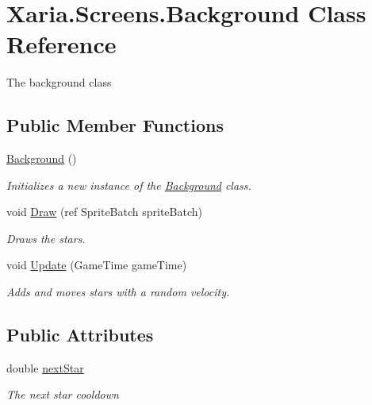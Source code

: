 \hypertarget{classXaria_1_1Screens_1_1Background}{}\section{Xaria.\+Screens.\+Background Class Reference}
\label{classXaria_1_1Screens_1_1Background}


The background class  


\subsection*{Public Member Functions}
\begin{DoxyCompactItemize}
\item 
\hyperlink{classXaria_1_1Screens_1_1Background_a458fa6c55e61b678da2812d182d021a8}{Background} ()
\begin{DoxyCompactList}\small\item\em Initializes a new instance of the \hyperlink{classXaria_1_1Screens_1_1Background}{Background} class. \end{DoxyCompactList}\item 
void \hyperlink{classXaria_1_1Screens_1_1Background_ad324cde0b40966085c72a167f9ef940e}{Draw} (ref Sprite\+Batch sprite\+Batch)
\begin{DoxyCompactList}\small\item\em Draws the stars. \end{DoxyCompactList}\item 
void \hyperlink{classXaria_1_1Screens_1_1Background_a5008a9ab39ee86f901e965f9121b08e2}{Update} (Game\+Time game\+Time)
\begin{DoxyCompactList}\small\item\em Adds and moves stars with a random velocity. \end{DoxyCompactList}\end{DoxyCompactItemize}
\subsection*{Public Attributes}
\begin{DoxyCompactItemize}
\item 
double \hyperlink{classXaria_1_1Screens_1_1Background_a6ebc6e316dfe7749361c94d7ce128bc0}{next\+Star}
\begin{DoxyCompactList}\small\item\em The next star cooldown \end{DoxyCompactList}\end{DoxyCompactItemize}
